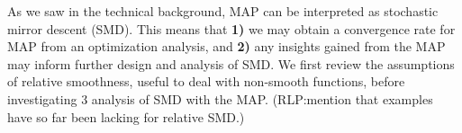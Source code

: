 \documentclass[twoside]{article}
\newcommand{\rlp}[1]{\textcolor{BrickRed}{(RLP:#1)}}
\newcommand{\logpart}{A}
\newcommand{\bregman}{\cB_\logpart}
\newcommand{\nat}{\theta}
\newcommand{\m}{\mu}
\newcommand{\lr}{\gamma} %
\begin{document}
%

As we saw in the technical background, MAP can be interpreted as stochastic mirror descent (SMD).
This means that \textbf{1)} we may obtain a convergence rate for MAP from an optimization analysis, and \textbf{2)} any insights gained from the MAP may inform further design and analysis of SMD.
We first review the assumptions of relative smoothness, useful to deal with non-smooth functions, before investigating 3 analysis of SMD with the MAP.
\rlp{mention that examples have so far been lacking for relative SMD.}
\end{document}
